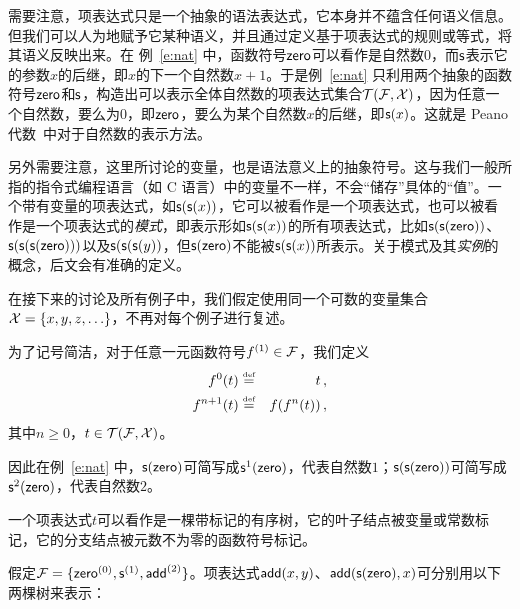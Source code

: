 需要注意，项表达式只是一个抽象的语法表达式，它本身并不蕴含任何语义信息。但我们可以人为地赋予它某种语义，并且通过定义基于项表达式的规则或等式，将其语义反映出来。在
例~\ref{e:nat} 中，函数符号$\zero$可以看作是自然数$0$，而$\s$表示它的参数$x$的后继，即$x$的下一个自然数$x+1$。于是例~\ref{e:nat} 只利用两个抽象的函数符号$\zero$和$\s$，构造出可以表示全体自然数的项表达式集合$\TFX$，因为任意一个自然数，要么为$0$，即$\zero$，要么为某个自然数$x$的后继，即$\s(x)$。这就是 Peano 代数~\cite{Kaye1991-KAYMOP}中对于自然数的表示方法。

另外需要注意，这里所讨论的变量，也是语法意义上的抽象符号。这与我们一般所指的指令式编程语言（如 C 语言）中的变量不一样，不会“储存”具体的“值”。一个带有变量的项表达式，如$\s(\s(x))$，它可以被看作是一个项表达式，也可以被看作是一个项表达式的\emph{模式}，即表示形如$\s(\s(x))$的所有项表达式，比如$\s(\s(\zero))$、$\s(\s(\s(\zero)))$以及$\s(\s(\s(y))$，但$\s(\zero)$不能被$\s(\s(x))$所表示。关于模式及其\emph{实例}的概念，后文会有准确的定义。

在接下来的讨论及所有例子中，我们假定使用同一个可数的变量集合$\cX=\{x,y,z,\ldots\}$，不再对每个例子进行复述。

为了记号简洁，对于任意一元函数符号$f^{(1)}\in\cF$，我们定义
\begin{eqnarray}
    f^0(t) & \defeq & t \, ,     \nonumber \\
    f^{n+1}(t) & \defeq & f(f^n(t)) \, ,\nonumber 
\end{eqnarray}
其中$n\ge 0$，$t\in\TFX$。

因此在例~\ref{e:nat} 中，$\s(\zero)$可简写成$\s^1(\zero)$，代表自然数$1$；$\s(\s(\zero))$可简写成$\s^2(\zero)$，代表自然数$2$。

一个项表达式$t$可以看作是一棵带标记的有序树，它的叶子结点被变量或常数标记，它的分支结点被元数不为零的函数符号标记。

\begin{example}
\label{e:term-tree}
假定$\cF = \{\zero^{(0)}, \s^{(1)}, \add^{(2)}\}$。项表达式$\add(x,y)$、$\add(\s(\zero), x)$可分别用以下两棵树来表示：

\medskip
\centering
{}
\end{example}


